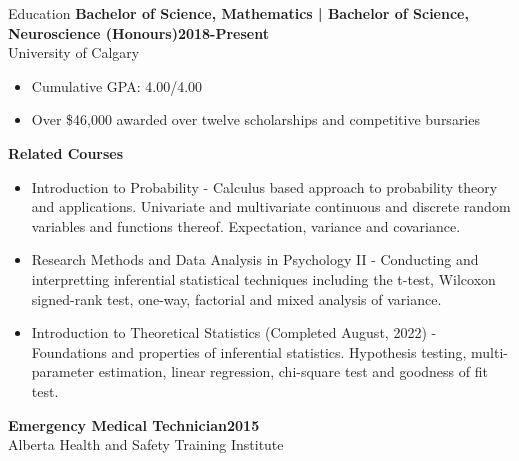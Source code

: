 \documentclass[12pt]{resume}
\begin{document}
\begin{rSection}{\Large Education}
   {\bf Bachelor of Science, Mathematics | Bachelor of Science, Neuroscience (Honours)\hfill{2018-Present}}\\
   University of Calgary
   \begin{itemize}
        \setlength\itemsep{-0.5em}
       \item Cumulative GPA: 4.00/4.00 
       \item Over \$46,000 awarded over twelve scholarships and competitive bursaries 
   \end{itemize}
   {\bf Related Courses}
   \begin{itemize}
        \setlength\itemsep{-0.5em}
        \item Introduction to Probability - Calculus based approach to probability theory and applications. 
        Univariate and multivariate continuous and discrete random variables and functions thereof. Expectation, 
        variance and covariance. 
        \item Research Methods and Data Analysis in Psychology II - Conducting and interpretting inferential 
        statistical techniques including the t-test, Wilcoxon signed-rank test, one-way, factorial and mixed 
        analysis of variance. 
        \item Introduction to Theoretical Statistics (Completed August, 2022) - Foundations and properties of
        inferential statistics. Hypothesis testing, multi-parameter estimation, linear regression, chi-square 
        test and goodness of fit test.
   \end{itemize}
   {\bf Emergency Medical Technician\hfill {2015}}\\
   Alberta Health and Safety Training Institute
\end{rSection}
\end{document}
